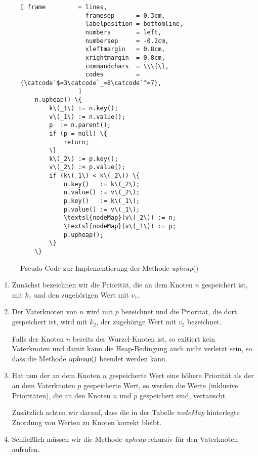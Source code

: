 \begin{figure}[!ht]
\centering
\begin{Verbatim}[ frame         = lines, 
                  framesep      = 0.3cm, 
                  labelposition = bottomline,
                  numbers       = left,
                  numbersep     = -0.2cm,
                  xleftmargin   = 0.8cm,
                  xrightmargin  = 0.8cm,
                  commandchars  = \\\{\},
                  codes         = {\catcode`$=3\catcode`_=8\catcode`^=7},
                ]
    n.upheap() \{
        k\(_1\) := n.key();
        v\(_1\) := n.value();
        p  := n.parent();
        if (p = null) \{ 
            return;
        \}
        k\(_2\) := p.key();
        v\(_2\) := p.value();
        if (k\(_1\) < k\(_2\)) \{
            n.key()   := k\(_2\);
            n.value() := v\(_2\);
            p.key()   := k\(_1\);
            p.value() := v\(_1\);
            \textsl{nodeMap}(v\(_2\)) := n;
            \textsl{nodeMap}(v\(_1\)) := p;
            p.upheap();
        \}
    \}
\end{Verbatim}
\vspace*{-0.3cm}
\caption{Pseudo-Code zur Implementierung der Methode \textsl{upheap}()}
\label{fig:upheap.pseudo}
\end{figure}%

\begin{enumerate}
\item Zun\"achst bezeichnen wir die Priorit\"at, die an dem Knoten $n$ gespeichert ist,
      mit $k_1$ und den zugeh\"origen Wert mit $v_1$.
\item Der Vaterknoten von $n$ wird mit $p$ bezeichnet und die Priorit\"at, die dort gespeichert ist,
      wird mit $k_2$, der zugeh\"orige Wert mit $v_2$ bezeichnet.  

      Falls der Knoten $n$
      bereits der Wurzel-Knoten ist, so exitiert kein  Vaterknoten und damit kann die
      Heap-Bedingung auch nicht verletzt sein, so dass die Methode $\textsl{upheap}()$
      beendet werden kann.
\item Hat nun der an dem Knoten $n$ gespeicherte Wert eine h\"ohere Priorit\"at als der an dem
      Vaterknoten $p$ gespeicherte Wert, so werden die Werte (inklusive Priorit\"aten), die
      an den Knoten $n$ und $p$ gespeichert sind, vertauscht.  

      Zus\"atzlich achten wir darauf, dass die in der Tabelle \textsl{nodeMap} hinterlegte
      Zuordung von Werten zu Knoten korrekt bleibt.
\item Schlie{\ss}lich m\"ussen wir die Methode \textsl{upheap} rekursiv f\"ur den Vaterknoten aufrufen.
\end{enumerate}


